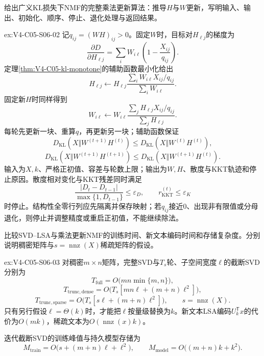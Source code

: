 \begin{SLChapterExercisePairSection}
\begin{exercise}\label{ex:V4-C05-S06-02}
给出广义KL损失下NMF的完整乘法更新算法：推导$H$与$W$更新，写明输入、输出、初始化、顺序、停止、退化处理与返回结果。
\end{exercise}
\ifSLFullEdition
{}\label{sol:V4-C05-S06-02}
\begin{chapterexercisesolution}{ex:V4-C05-S06-02}
记$q_{ij}=(WH)_{ij}>0$。固定$W$时，目标对$H_{\ell j}$的梯度为
\[
\frac{\partial D}{\partial H_{\ell j}}
=\sum_iW_{i\ell}\left(1-\frac{X_{ij}}{q_{ij}}\right).
\]
定理\ref{thm:V4-C05-kl-monotone}的辅助函数最小化给出
\[
H_{\ell j}\leftarrow H_{\ell j}
\frac{\sum_iW_{i\ell}X_{ij}/q_{ij}}{\sum_iW_{i\ell}}.
\]
固定新$H$时同样得到
\[
W_{i\ell}\leftarrow W_{i\ell}
\frac{\sum_jH_{\ell j}X_{ij}/q_{ij}}{\sum_jH_{\ell j}}.
\]
每轮先更新一块、重算$q$，再更新另一块；辅助函数保证
\[
D_{\mathrm{KL}}(X\Vert W^{(t+1)}H^{(t)})
\le D_{\mathrm{KL}}(X\Vert W^{(t)}H^{(t)}),
\]
\[
D_{\mathrm{KL}}(X\Vert W^{(t+1)}H^{(t+1)})
\le D_{\mathrm{KL}}(X\Vert W^{(t+1)}H^{(t)}).
\]
输入为$X,k$、严格正初值、容差与轮数上限；输出为$W,H$、散度与KKT轨迹和停止原因。散度相对变化与KKT残差同时满足
\[
\frac{|D_t-D_{t-1}|}{\max\{1,D_{t-1}\}}\le\varepsilon_D,
\qquad
r_{\mathrm{KKT}}^{(t)}\le\varepsilon_K
\]
时停止。结构性全零行列应先隔离并保存映射；若$q_{ij}$接近0、出现非有限值或分母退化，则停止并调整精度或重启正初值，不能继续除法。
\end{chapterexercisesolution}
\fi

\begin{exercise}\label{ex:V4-C05-S06-03}
比较SVD--LSA与乘法更新NMF的训练时间、新文本编码时间和存储复杂度。分别说明稠密矩阵与$s=\operatorname{nnz}(X)$稀疏矩阵的假设。
\end{exercise}
\ifSLFullEdition
{}\label{sol:V4-C05-S06-03}
\begin{chapterexercisesolution}{ex:V4-C05-S06-03}
对稠密$m\times n$矩阵，完整SVD与$T_s$轮、子空间宽度$\ell$的截断SVD分别为
\[
T_{\mathrm{full}}=O\bigl(mn\min\{m,n\}\bigr),
\]
\[
T_{\mathrm{trunc,dense}}
=O\bigl(T_s[mn\ell+(m+n)\ell^2]\bigr),
\]
\[
T_{\mathrm{trunc,sparse}}
=O\bigl(T_s[s\ell+(m+n)\ell^2]\bigr),
\qquad s=\operatorname{nnz}(X).
\]
只有另行假设$\ell=\Theta(k)$时，才能把$\ell$按量级替换为$k$。新文本LSA编码$U_k^{\mathsf T}x$的代价为$O(mk)$，稀疏文本为$O(\operatorname{nnz}(x)k)$。

迭代截断SVD的训练峰值与持久模型存储为
\[
M_{\mathrm{train}}
=O\bigl(s+(m+n)\ell+\ell^2\bigr),
\qquad
M_{\mathrm{model}}=O\bigl((m+n)k+k^2\bigr).
\]


\end{chapterexercisesolution}
\end{SLChapterExercisePairSection}
